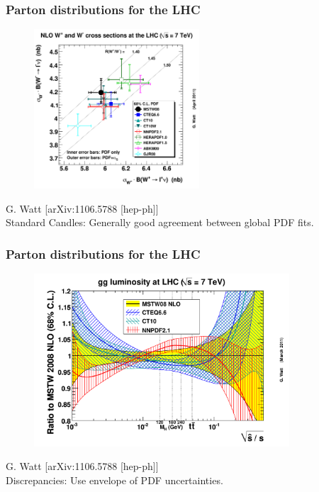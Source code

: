 \documentclass[10pt]{beamer}
\begin{document}
\begin{frame}
\frametitle{Parton distributions for the LHC}
\begin{figure}[b!]
    \begin{center}
      \includegraphics[width=0.55\textwidth]{w+w-lhc7nlo68err.eps}
    \end{center}
\end{figure}
{ \centering \small \color{blue} G. Watt [arXiv:1106.5788 [hep-ph]]}\\
Standard Candles: Generally good agreement between global PDF fits.
\end{frame}
\begin{frame}
\frametitle{Parton distributions for the LHC}
\begin{figure}[b!]
    \begin{center}
            \includegraphics[width=0.85\textwidth]{ratiogglumi1_68cl.eps}
    \end{center}
\end{figure}
{ \centering \small \color{blue} G. Watt [arXiv:1106.5788 [hep-ph]]}\\
Discrepancies: Use envelope of PDF uncertainties.
\end{frame}
\end{document}
